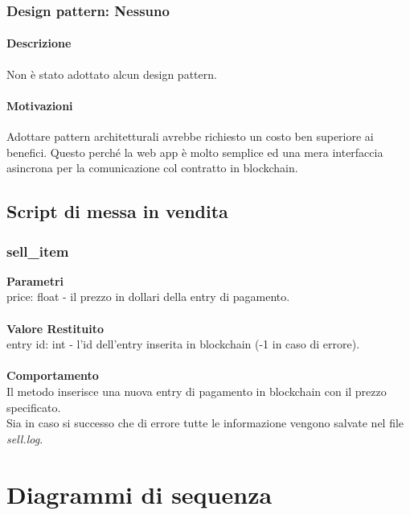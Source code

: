 \documentclass[a4paper, 12pt]{article}
\begin{document}
\subsubsection{Design pattern: Nessuno}
\paragraph{Descrizione}
Non è stato adottato alcun design pattern.
\paragraph{Motivazioni}
Adottare pattern architetturali avrebbe richiesto un costo ben superiore ai benefici. Questo perché la web app è molto semplice ed una mera interfaccia asincrona per la comunicazione col contratto in blockchain.

\subsection{Script di messa in vendita}
\subsubsection{sell\_item}
\textbf{Parametri}\\
price: float - il prezzo in dollari della entry di pagamento.\\\\
\textbf{Valore Restituito}\\
entry id: int - l'id dell'entry inserita in blockchain (-1 in caso di errore).\\\\
\textbf{Comportamento}\\
Il metodo inserisce una nuova entry di pagamento in blockchain con il prezzo specificato.\\
Sia in caso si successo che di errore tutte le informazione vengono salvate nel file \textit{sell.log}.

\section{Diagrammi di sequenza}
\end{document}
